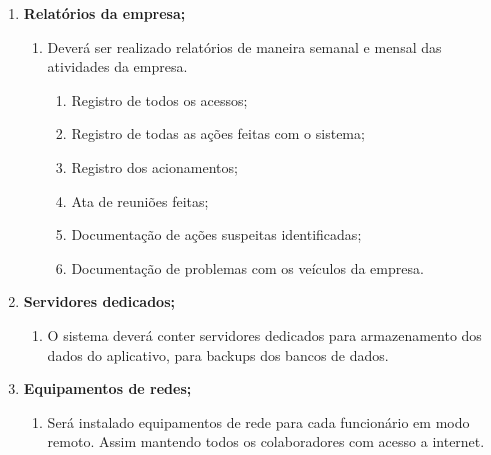\begin{enumerate}
\begin{enumerate}
\begin{enumerate}
                        \end{enumerate}
            \end{enumerate}

      \item \textbf{Relatórios da empresa;}
            \begin{enumerate}

                  \item	Deverá ser realizado relatórios de maneira semanal e mensal das atividades da empresa.

                        \begin{enumerate}
                              \item Registro de todos os acessos;
                              \item Registro de todas as ações feitas com o sistema;
                              \item Registro dos acionamentos;
                              \item Ata de reuniões feitas;
                              \item Documentação de ações suspeitas identificadas;

                              \item Documentação de problemas com os veículos da empresa.
                        \end{enumerate}
            \end{enumerate}



      \item \textbf{Servidores dedicados;}
            \begin{enumerate}

                  \item	O sistema deverá conter servidores dedicados para armazenamento dos dados do aplicativo, para backups dos bancos de dados.



            \end{enumerate}

      \item \textbf {Equipamentos de redes;}
            \begin{enumerate}

                  \item	Será instalado equipamentos de rede para cada funcionário em modo remoto. Assim mantendo todos os colaboradores com acesso a internet.




\end{enumerate}
\end{enumerate}
